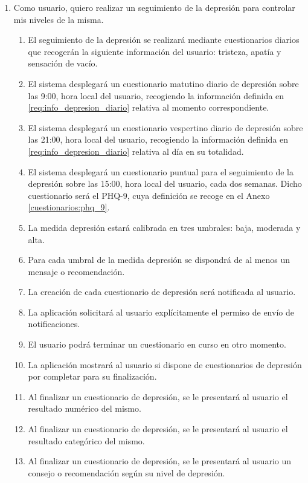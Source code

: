         \begin{enumerate}[resume=req-usuario,label=\textbf{\texttt{RU-\arabic*}}]
            \item Como usuario, quiero realizar un seguimiento de la depresión para controlar mis niveles de la misma.
            \begin{enumerate}[resume=req-funcionales,label=\textbf{\texttt{RF-\arabic*}}]
                \item \label{req:info_depresion_diario} El seguimiento de la depresión se realizará mediante cuestionarios diarios que recogerán la siguiente información del usuario: tristeza, apatía y sensación de vacío.
                \item El sistema desplegará un cuestionario matutino diario de depresión sobre las 9:00, hora local del usuario, recogiendo la información definida en \ref{req:info_depresion_diario} relativa al momento correspondiente.
                \item  El sistema desplegará un cuestionario vespertino diario de depresión sobre las 21:00, hora local del usuario, recogiendo la información definida en \ref{req:info_depresion_diario} relativa al día en su totalidad.
                \item El sistema desplegará un cuestionario puntual para el seguimiento de la depresión sobre las 15:00, hora local del usuario, cada dos semanas. Dicho cuestionario será el PHQ-9, cuya definición se recoge en el Anexo \ref{cuestionarios:phq_9}.
                \item La medida depresión estará calibrada en tres umbrales: baja, moderada y alta.
                \item Para cada umbral de la medida depresión se dispondrá de al menos un mensaje o recomendación.
                \item La creación de cada cuestionario de depresión será notificada al usuario.
                \item La aplicación solicitará al usuario explícitamente el permiso de envío de notificaciones.
                \item El usuario podrá terminar un cuestionario en curso en otro momento.
                \item La aplicación mostrará al usuario si dispone de cuestionarios de depresión por completar para su finalización.
                \item Al finalizar un cuestionario de depresión, se le presentará al usuario el resultado numérico del mismo.
                \item Al finalizar un cuestionario de depresión, se le presentará al usuario el resultado categórico del mismo.
                \item Al finalizar un cuestionario de depresión, se le presentará al usuario un consejo o recomendación según su nivel de depresión.
            \end{enumerate}
        \end{enumerate}
